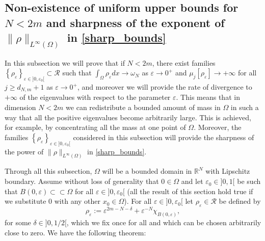 \documentclass[11pt,a4paper]{amsart}
\numberwithin{equation}{section}
\begin{document}




\subsection{Non-existence of uniform upper bounds for \texorpdfstring{$N<2m$}{N<2m} and sharpness of the exponent of \texorpdfstring{$\|\rho\|_{L^{\infty}(\Omega)}$}{Linf} in \texorpdfstring{\eqref{sharp_bounds}}{3}}\label{sub:32}
In this subsection we will prove that if $N<2m$, there exist families $\left\{\rho_{\varepsilon}\right\}_{\varepsilon\in]0,\varepsilon_0[}\subset\mathcal R$ such that $\int_{\Omega}\rho_{\varepsilon}dx\rightarrow\omega_N$ as $\varepsilon\rightarrow 0^+$ and $\mu_j[\rho_{\varepsilon}]\rightarrow +\infty$ for all $j\geq d_{N,m}+1$ as $\varepsilon\rightarrow 0^+$, and moreover we will provide the rate of divergence to $+\infty$ of the eigenvalues with respect to the parameter $\varepsilon$. This means that in dimension $N<2m$ we can redistribute a bounded amount of mass in $\Omega$ in such a way that all the positive eigenvalues become arbitrarily large. This is achieved, for example, by concentrating all the mass at one point of $\Omega$. Moreover, the families $\left\{\rho_{\varepsilon}\right\}_{\varepsilon\in]0,\varepsilon_0[}$ considered in this subsection will provide the sharpness of the power of $\|\rho\|_{L^{\infty}(\Omega)}$ in \eqref{sharp_bounds}.

Through all this subsection, $\Omega$ will be a bounded domain in $\mathbb R^N$ with Lipschitz boundary. Assume without loss of generality that $0\in\Omega$ and let $\varepsilon_0\in]0,1[$ be such that $B(0,\varepsilon)\subset\subset\Omega$ for all $\varepsilon\in]0,\varepsilon_0[$ (all the result of this section hold true if we substitute $0$ with any other $x_0\in\Omega$). For all $\varepsilon\in]0,\varepsilon_0[$ let $\rho_\varepsilon\in\mathcal R$ be defined by
\begin{equation}\label{rhoeps}
\rho_{\varepsilon}:=\varepsilon^{2m-N-\delta}+\varepsilon^{-N}\chi_{B(0,\varepsilon)},
\end{equation}
for some $\delta\in]0,1/2[$, which we fix once for all and which can be chosen arbitrarily close to zero. We have the following theorem:
\end{document}
